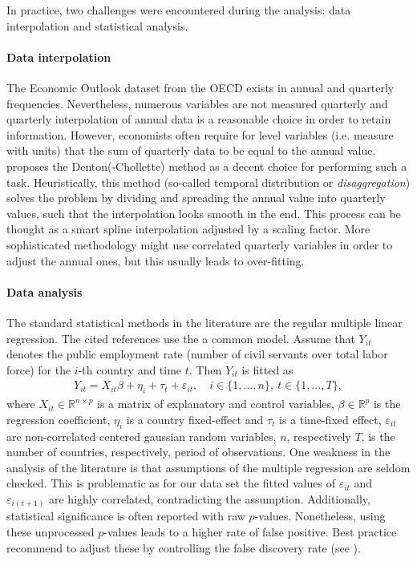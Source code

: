 In practice, two challenges were encountered during the analysis: data
interpolation and statistical analysis.

\paragraph{Data interpolation}

The Economic Outlook dataset from the OECD exists in annual and quarterly
frequencies. Nevertheless, numerous variables are not measured quarterly and
quarterly interpolation of annual data is a reasonable choice in order to
retain information. However, economists often require for level variables
(i.e. measure with units) that the sum of quarterly data to be equal to the
annual value.  \cite{sax2014tempdisagg} proposes the Denton(-Chollette) method
as a decent choice for performing such a task. Heuristically, this method
(so-called temporal distribution or \emph{disaggregation}) solves the problem
by dividing and spreading the annual value into quarterly values, such that the
interpolation looks smooth in the end. This process can be thought as a smart
spline interpolation adjusted by a scaling factor. More sophisticated
methodology might use correlated quarterly variables in order to adjust the
annual ones, but this usually leads to over-fitting.

\paragraph{Data analysis}

The standard statistical methods in the literature are the regular multiple
linear regression. The cited references use the a common model. Assume that
$Y_{it}$ denotes the public employment rate (number of civil servants over
total labor force) for the $i$-th country and time $t$. Then $Y_{it}$ is fitted
as
\begin{align} \label{eq:reg}
  Y_{it} = X_{it}\beta + \eta_i + \tau_t + \varepsilon_{it}, \quad i \in \{1, \dots, n\},\ t \in \{1, \dots, T\},
\end{align}
where $X_{it} \in \mathbb{R}^{n \times p}$ is a matrix of explanatory and
control variables, $\beta \in \mathbb{R}^{p}$ is the regression coefficient,
$\eta_i$ is a country fixed-effect and $\tau_t$ is a time-fixed effect,
$\varepsilon_{it}$ are non-correlated centered gaussian random variables, $n$,
respectively $T$, is the number of countries, respectively, period of
observations. One weakness in the analysis of the literature is that
assumptions of the multiple regression are seldom checked. This is problematic
as for our data set the fitted values of $\varepsilon_{it}$ and
$\varepsilon_{i(t+1)}$ are highly correlated, contradicting the
assumption. Additionally, statistical significance is often reported with raw
$p$-values. Nonetheless, using these unprocessed $p$-values leads to a higher
rate of false positive. Best practice recommend to adjust these by controlling
the false discovery rate (see \cite{benjamini1995controlling}).

